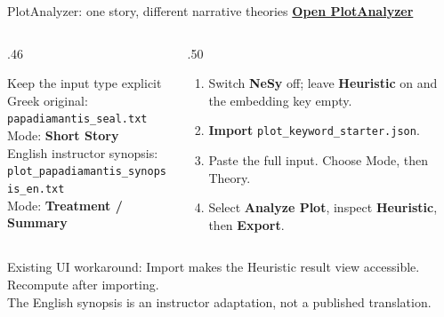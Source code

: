 \documentclass[aspectratio=169,10pt]{beamer}
\newcommand{\key}[1]{\textcolor{aegean}{\textbf{#1}}}
\newcommand{\source}[1]{\vfill{\scriptsize\color{slate}#1\par}}
\begin{document}
\begin{frame}{PlotAnalyzer: one story, different narrative theories}
  \href{https://greek-app-heaven-plot.livelyhill-85880e66.westeurope.azurecontainerapps.io}{\textbf{Open PlotAnalyzer}}\par\medskip
  \begin{columns}[T]
    \begin{column}{.46\textwidth}
      \begin{block}{Keep the input type explicit}
        \small Greek original:\\
        \texttt{papadiamantis\_seal.txt}\\
        Mode: \key{Short Story}\\[8pt]
        English instructor synopsis:\\
        \texttt{plot\_papadiamantis\_synopsis\_en.txt}\\
        Mode: \key{Treatment / Summary}
      \end{block}
    \end{column}
    \begin{column}{.50\textwidth}
      \small
      \begin{enumerate}
        \item Switch \textbf{NeSy} off; leave \textbf{Heuristic} on and the embedding key empty.
        \item \textbf{Import} \texttt{plot\_keyword\_starter.json}.
        \item Paste the full input. Choose Mode, then Theory.
        \item Select \textbf{Analyze Plot}, inspect \textbf{Heuristic}, then \textbf{Export}.
      \end{enumerate}
    \end{column}
  \end{columns}
  \source{Existing UI workaround: Import makes the Heuristic result view accessible. Recompute after importing.\\
  The English synopsis is an instructor adaptation, not a published translation.}
\end{frame}
\end{document}

